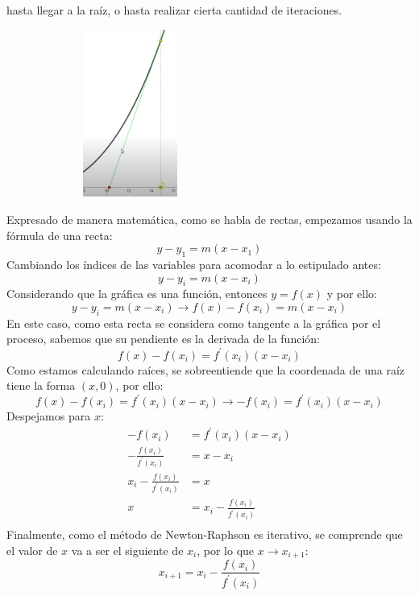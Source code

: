 \documentclass[letterpaper, 12pt]{article}
\begin{document}
hasta llegar a la raíz, o hasta realizar cierta cantidad de iteraciones.
\begin{figure}[H]
    \centering
    \includegraphics[height=5.5cm,width=6cm]{Despues.PNG}
\end{figure}
\justify
Expresado de manera matemática, como se habla de rectas, empezamos usando la fórmula de una recta:
\[y-y_1=m(x-x_1)\]
Cambiando los índices de las variables para acomodar a lo estipulado antes:
\[y-y_i=m(x-x_i)\]
Considerando que la gráfica es una función, entonces \(y=f(x)\) y por ello:
\[y-y_i=m(x-x_i)\rightarrow f(x)-f(x_i)=m(x-x_i)\]
En este caso, como esta recta se considera como tangente a la gráfica por el proceso, sabemos que su pendiente es la derivada de la función:
\[f(x)-f(x_i)=f^{\prime}\!(x_i)(x-x_i)\]
Como estamos calculando raíces, se sobreentiende que la coordenada de una raíz tiene la forma \((x,0)\), por ello:
\[f(x)-f(x_i)=f^{\prime}\!(x_i)(x-x_i)\rightarrow -f(x_i)=f^{\prime}\!(x_i)(x-x_i)\]
Despejamos para \(x\):
\begin{equation*}
    \begin{aligned}
        -f(x_i)&=f^{\prime}\!(x_i)(x-x_i)\\[5pt]
        -\frac{f(x_i)}{f^{\prime}\!(x_i)}&=x-x_i\\[5pt]
        x_i-\frac{f(x_i)}{f^{\prime}\!(x_i)}&=x\\[5pt]
        x&=x_i-\frac{f(x_i)}{f^{\prime}\!(x_i)}\\[5pt]
    \end{aligned}
\end{equation*}
Finalmente, como el método de Newton-Raphson es iterativo, se comprende que el valor de \(x\) va a ser el siguiente de \(x_i\), por lo que \(x\rightarrow x_{i+1}\):
\[x_{i+1}=x_i-\frac{f(x_i)}{f^{\prime}\!(x_i)}\]
\end{document}
